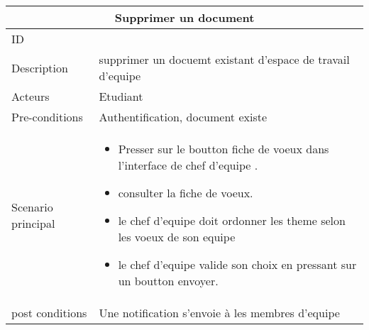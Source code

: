 \documentclass[11pt,fleqn]{book} %
\begin{document}
\begin{center}
\begin{tabularx}{1\textwidth} { | p{4cm} | >{\raggedright\arraybackslash}X |  }
  \hline
  \multicolumn{2}{|c|}{Supprimer un document} \\
 \hline
 ID & 2  \\
 \hline
 Description  & supprimer un docuemt existant d'espace de travail d'equipe \\
  \hline
 Acteurs  & Etudiant   \\
  \hline
 Pre-conditions  & Authentification, document existe\\
 \hline
 Scenario principal  &  
 \begin{itemize}
     \item Presser sur le boutton fiche de voeux dans l’interface de chef d’equipe .
     \item consulter la fiche de voeux.
     \item le chef d’equipe doit ordonner les theme selon les voeux de son equipe
     \item le chef d’equipe valide son choix en pressant sur un boutton envoyer.

 \end{itemize}\\
  \hline
 post conditions  &  Une notification s’envoie à les membres d'equipe  \\
  \hline
\end{tabularx}
\label{tbl:nicetablelesstable}
\end{center}
\end{document}
